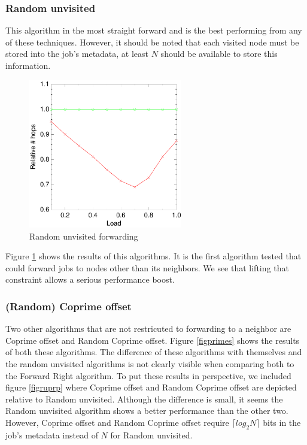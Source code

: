 \documentclass[10pt,a4paper]{article}
\begin{document}
\subsubsection*{Random unvisited}
This algorithm in the most straight forward and is the best performing from any of these techniques. However, it should be noted that each visited node must be stored into the job's metadata, at least $N$ should be available to store this information.

\begin{figure}[h!tb]
\centering
\includegraphics[width=0.6\textwidth]{data/randunvisitedright.pdf}
\caption{Random unvisited forwarding}
\label{figrandunvisited}
\end{figure}

Figure \ref{figrandunvisited} shows the results of this algorithms. It is the first algorithm tested that could forward jobs to nodes other than its neighbors. We see that lifting that constraint allows a serious performance boost.

\subsubsection*{(Random) Coprime offset}
Two other algorithms that are not restricuted to forwarding to a neighbor are Coprime offset and Random Coprime offset. Figure \ref{figprimes} shows the results of both these algorithms. The difference of these algorithms with themselves and the random unvisited algorithms is not clearly visible when comparing both to the Forward Right algorithm. To put these results in perspective, we included figure \ref{figruprp} where Coprime offset and Random Coprime offset are depicted relative to Random unvisited. Although the difference is small, it seems the Random unvisited algorithm shows a better performance than the other two. However, Coprime offset and Random Coprime offset require $\lceil log_2 N \rceil$ bits in the job's metadata instead of $N$ for Random unvisited.
\end{document}
